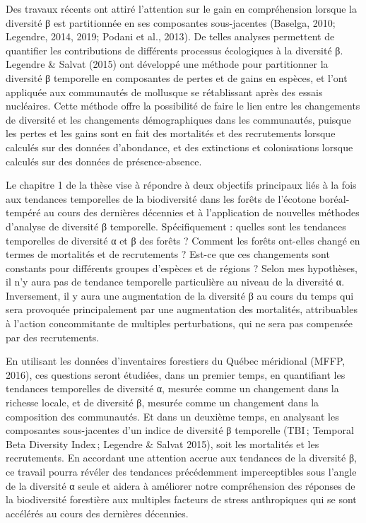 \documentclass[
]{article}
\begin{document}
Des travaux récents ont attiré l'attention sur le gain en compréhension
lorsque la diversité β est partitionnée en ses composantes sous-jacentes
(Baselga, 2010; Legendre, 2014, 2019; Podani et al., 2013). De telles
analyses permettent de quantifier les contributions de différents
processus écologiques à la diversité β. Legendre \& Salvat (2015) ont
développé une méthode pour partitionner la diversité β temporelle en
composantes de pertes et de gains en espèces, et l'ont appliquée aux
communautés de mollusque se rétablissant après des essais nucléaires.
Cette méthode offre la possibilité de faire le lien entre les
changements de diversité et les changements démographiques dans les
communautés, puisque les pertes et les gains sont en fait des mortalités
et des recrutements lorsque calculés sur des données d'abondance, et des
extinctions et colonisations lorsque calculés sur des données de
présence-absence.

Le chapitre 1 de la thèse vise à répondre à deux objectifs principaux
liés à la fois aux tendances temporelles de la biodiversité dans les
forêts de l'écotone boréal-tempéré au cours des dernières décennies et à
l'application de nouvelles méthodes d'analyse de diversité β temporelle.
Spécifiquement : quelles sont les tendances temporelles de diversité α
et β des forêts ? Comment les forêts ont-elles changé en termes de
mortalités et de recrutements ? Est-ce que ces changements sont
constants pour différents groupes d'espèces et de régions ? Selon mes
hypothèses, il n'y aura pas de tendance temporelle particulière au
niveau de la diversité α. Inversement, il y aura une augmentation de la
diversité β au cours du temps qui sera provoquée principalement par une
augmentation des mortalités, attribuables à l'action concommitante de
multiples perturbations, qui ne sera pas compensée par des recrutements.

En utilisant les données d'inventaires forestiers du Québec méridional
(MFFP, 2016), ces questions seront étudiées, dans un premier temps, en
quantifiant les tendances temporelles de diversité α, mesurée comme un
changement dans la richesse locale, et de diversité β, mesurée comme un
changement dans la composition des communautés. Et dans un deuxième
temps, en analysant les composantes sous-jacentes d'un indice de
diversité β temporelle (TBI\,; Temporal Beta Diversity Index\,; Legendre
\& Salvat 2015), soit les mortalités et les recrutements. En accordant
une attention accrue aux tendances de la diversité β, ce travail pourra
révéler des tendances précédemment imperceptibles sous l'angle de la
diversité α seule et aidera à améliorer notre compréhension des réponses
de la biodiversité forestière aux multiples facteurs de stress
anthropiques qui se sont accélérés au cours des dernières décennies.
\end{document}
